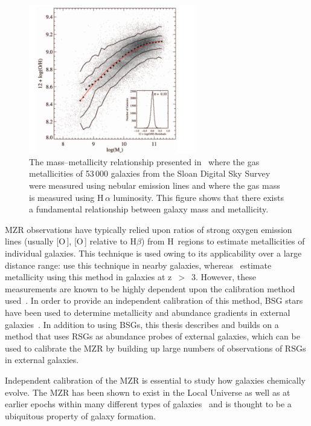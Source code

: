 \begin{figure}
 \centering
 \includegraphics[width=0.65\textwidth]{intro/MZR}
 \caption[\citeauthor{Tremonti04} mass--metallicity relationship]{The mass--metallicity relationship presented in~\cite{Tremonti04} where the gas metallicities of 53\,000 galaxies from the Sloan Digital Sky Survey were measured using nebular emission lines and where the gas mass is measured using H\,$\alpha$ luminosity.
 This figure shows that there exists a fundamental relationship between galaxy mass and metallicity.
 \label{fig:MZR}}
\end{figure}

MZR observations have typically relied upon ratios of strong oxygen emission lines (usually [O\,\2], [O\,\3] relative to H$\beta$) from H\,\2 regions to estimate metallicities of individual galaxies.
This technique is used owing to its applicability over a large distance range:
\cite{2001MNRAS.323..887C} use this technique in nearby galaxies, whereas~\cite{Maiolino08} estimate metallicity using this method in galaxies at z~$>$~3.
However, these measurements are known to be highly dependent upon the calibration method used~\citep{Kewley08,2008ApJ...681..269K,Bresolin09}.
In order to provide an independent calibration of this method, BSG stars have been used to determine metallicity and abundance gradients in external galaxies~\citep{Kudritzki12}.
In addition to using BSGs, this thesis describes and builds on a method that uses RSGs as abundance probes of external galaxies, which can be used to calibrate the MZR by building up large numbers of observations of RSGs in external galaxies.

Independent calibration of the MZR is essential to study how galaxies chemically evolve.
The MZR has been shown to exist in the Local Universe as well as at earlier epochs within many different types of galaxies~\citep[e.g.][]{2011ApJ...730..137Z,2013ApJ...765..140A,2014MNRAS.440.2300C,2014ApJ...795..165S,2014MNRAS.437.3647Y,2015ApJ...799..138S} and is thought to be a ubiquitous property of galaxy formation.

